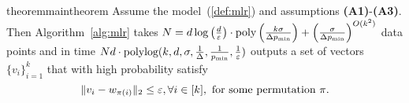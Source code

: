%
%
%
%

\begin{restatable}[Main]{theorem}{maintheorem}
\label{thm:main} 
Assume the model~(\ref{def:mlr}) and assumptions \textbf{(A1)}-\textbf{(A3)}. Then Algorithm~\ref{alg:mlr} takes 
$N=d \log\left(\frac{d}{\varepsilon}\right)\cdot \textrm{poly}\left(\frac{k\sigma}{\Delta p_{\min}} \right) +  \left( \frac{\sigma }{\Delta p_{\min} } \right)^{O(k^2)}$ 
data points and in time $Nd \cdot \textrm{polylog}(k, d, \sigma, \frac{1}{\Delta}, \frac{1}{p_{\min}}, \frac{1}{\varepsilon}) $  outputs a set of vectors $\{v_i\}_{i=1}^k$ that with high probability satisfy
$$
  \|v_i  - w_{\pi(i)} \|_2 \le \varepsilon, \forall i \in [k], ~\mbox{for some permutation $\pi$}.
$$ 
\end{restatable}

